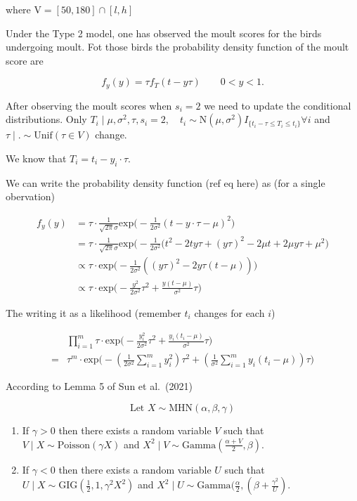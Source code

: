 \documentclass[
  12pt,
]{article}
\begin{document}
where \(\text{V} = [50,180] \cap [l,h]\)

Under the Type 2 model, one has observed the moult scores for the birds
undergoing moult. Fot those birds the probability density function of
the moult score are

\[
f_y(y) = \tau f_T(t-y\tau) \qquad 0<y<1. 
\]

After observing the moult scores when \(s_i=2\) we need to update the
conditional distributions. Only
\(T_i \mid \mu,\sigma^2,\tau,s_i =2, \quad t_i  \sim \text{N}(\mu, \sigma^2) I_{\{t_i-\tau \leq T_i \leq t_i \}} \forall i\)
and \(\tau \mid . \sim \text{Unif}(\tau \in V)\) change.

We know that \(T_i = t_i-y_i \cdot \tau\).

We can write the probability density function (ref eq here) as (for a
single obervation)

\[
\begin{aligned}
f_y(y) & = \tau \cdot \frac{1}{\sqrt{2\pi}\sigma} \text{exp}\big(-\frac{1}{2\sigma^2}(t-y\cdot \tau-\mu)^2\big) \\
& = \tau \cdot \frac{1}{\sqrt{2\pi}\sigma} \text{exp}\big(-\frac{1}{2\sigma^2}(t^2 - 2ty \tau + (y\tau)^2 - 2\mu t + 2\mu y \tau +\mu^2\big) \\
& \propto \tau \cdot \text{exp}\big(-\frac{1}{2\sigma^2}((y\tau)^2 -2y\tau(t-\mu))\big) \\
& \propto \tau \cdot \text{exp} \big( -\frac{y^2}{2\sigma^2} \tau^2 + \frac{y(t-\mu)}{\sigma^2}\tau\big)
\end{aligned}
\]

The writing it as a likelihood (remember \(t_i\) changes for each \(i\))

\[
\begin{aligned}
& \prod^m_{i=1} \tau \cdot \text{exp} \big( -\frac{y_i^2}{2\sigma^2} \tau^2 + \frac{y_i(t_i-\mu)}{\sigma^2}\tau\big) \\
= & \tau^m \cdot \text{exp}\big(-(\frac{1}{2\sigma^2} \sum^m_{i=1} y_i^2)\tau^2 + (\frac{1}{\sigma^2} \sum^m_{i=1} y_i(t_i-\mu))\tau\big)
\end{aligned}
\]

According to Lemma 5 of Sun et al.~(2021)

\[
\text{Let } X \sim \text{MHN}(\alpha, \beta, \gamma)
\]

\begin{enumerate}
\def\labelenumi{\alph{enumi}.}
\item
  If \(\gamma>0\) then there exists a random variable \(V\) such that
  \(V\mid X \sim \text{Poisson}(\gamma X)\) and
  \(X^2 \mid V \sim \text{Gamma}(\frac{\alpha +V}{2}, \beta)\).
\item
  If \(\gamma<0\) then there exists a random variable \(U\) such that
  \(U\mid X \sim \text{GIG}(\frac{1}{2},1,\gamma^2 X^2)\) and
  \(X^2 \mid U \sim \text{Gamma}(\frac{\alpha}{2}, (\beta + \frac{\gamma^2}{U})\).
\end{enumerate}
\end{document}
